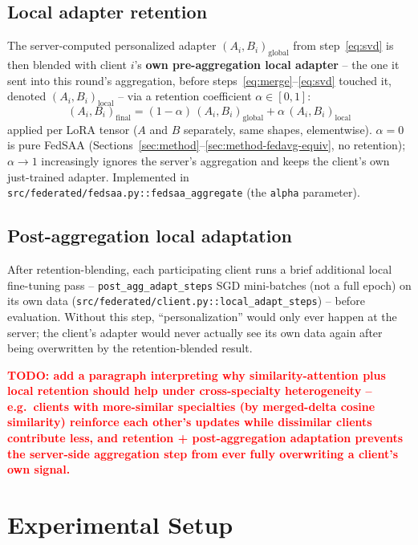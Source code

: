 \documentclass[11pt]{article}
\newcommand{\todo}[1]{\textcolor{red}{\textbf{TODO: #1}}}
\begin{document}
\subsection{Local adapter retention}
\label{sec:method-retention}
The server-computed personalized adapter $(A_i,B_i)_{\text{global}}$ from
step~\eqref{eq:svd} is then blended with client $i$'s \textbf{own pre-aggregation local adapter}
-- the one it sent into this round's aggregation, before
steps~\eqref{eq:merge}--\eqref{eq:svd} touched it, denoted $(A_i,B_i)_{\text{local}}$ -- via a
retention coefficient $\alpha \in [0,1]$:
\begin{equation}
  (A_i, B_i)_{\text{final}} = (1-\alpha)\,(A_i,B_i)_{\text{global}} + \alpha\,(A_i,B_i)_{\text{local}}
  \label{eq:retention}
\end{equation}
applied per LoRA tensor ($A$ and $B$ separately, same shapes, elementwise). $\alpha=0$ is pure
FedSAA (Sections~\ref{sec:method}--\ref{sec:method-fedavg-equiv}, no retention); $\alpha \to 1$
increasingly ignores the server's aggregation and keeps the client's own just-trained adapter.
Implemented in \texttt{src/federated/fedsaa.py::fedsaa\_aggregate} (the \texttt{alpha} parameter).

\subsection{Post-aggregation local adaptation}
\label{sec:method-postadapt}
After retention-blending, each participating client runs a brief additional local fine-tuning
pass -- \texttt{post\_agg\_adapt\_steps} SGD mini-batches (not a full epoch) on its own data
(\texttt{src/federated/client.py::local\_adapt\_steps}) -- before evaluation. Without this step,
``personalization'' would only ever happen at the server; the client's adapter would never
actually see its own data again after being overwritten by the retention-blended result.

\todo{add a paragraph interpreting why similarity-attention plus local retention should help
under cross-specialty heterogeneity -- e.g.\ clients with more-similar specialties (by
merged-delta cosine similarity) reinforce each other's updates while dissimilar clients
contribute less, and retention + post-aggregation adaptation prevents the server-side
aggregation step from ever fully overwriting a client's own signal.}

\section{Experimental Setup}
\label{sec:setup}
\end{document}
